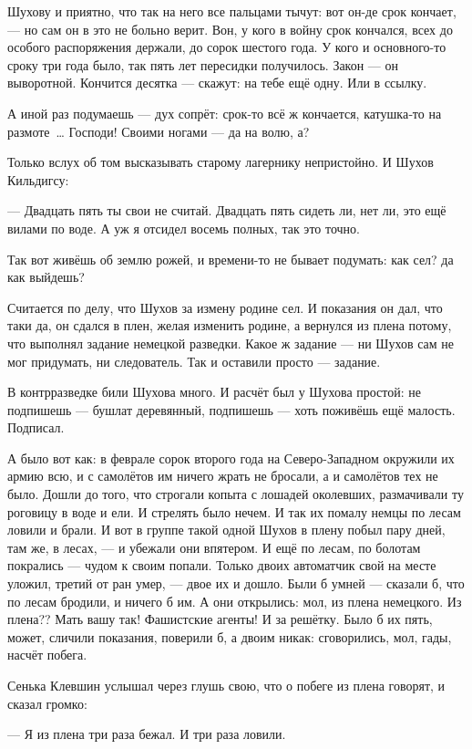Шухову и приятно, что так на него все пальцами тычут: вот он-де срок кончает, --- но сам он в это не больно верит. Вон, у кого в войну срок кончался, всех до особого распоряжения держали, до сорок шестого года. У кого и основного-то сроку три года было, так пять лет пересидки получилось. Закон --- он выворотной. Кончится десятка --- скажут: на тебе ещё одну. Или в ссылку.

А иной раз подумаешь --- дух сопрёт: срок-то всё ж кончается, катушка‐то на размоте~\dots{} Господи! Своими ногами --- да на волю, а?

Только вслух об том высказывать старому лагернику непристойно. И Шухов Кильдигсу:

--- Двадцать пять ты свои не считай. Двадцать пять сидеть ли, нет ли, это ещё вилами по воде. А уж я отсидел восемь полных, так это точно.

Так вот живёшь об землю рожей, и времени-то не бывает подумать: как сел? да как выйдешь?

Считается по делу, что Шухов за измену родине сел. И показания он дал, что таки да, он сдался в плен, желая изменить родине, а вернулся из плена потому, что выполнял задание немецкой разведки. Какое ж задание --- ни Шухов сам не мог придумать, ни следователь. Так и оставили просто --- задание.

В контрразведке били Шухова много. И расчёт был у Шухова простой: не подпишешь --- бушлат деревянный, подпишешь --- хоть поживёшь ещё малость. Подписал.

А было вот как: в феврале сорок второго года на Северо-Западном окружили их армию всю, и с самолётов им ничего жрать не бросали, а и самолётов тех не было. Дошли до того, что строгали копыта с лошадей околевших, размачивали ту роговицу в воде и ели. И стрелять было нечем. И так их помалу немцы по лесам ловили и брали. И вот в группе такой одной Шухов в плену побыл пару дней, там же, в лесах, --- и убежали они впятером. И ещё по лесам, по болотам покрались --- чудом к своим попали. Только двоих автоматчик свой на месте уложил, третий от ран умер, --- двое их и дошло. Были б умней --- сказали б, что по лесам бродили, и ничего б им. А они открылись: мол, из плена немецкого. Из плена?? Мать вашу так! Фашистские агенты! И за решётку. Было б их пять, может, сличили показания, поверили б, а двоим никак: сговорились, мол, гады, насчёт побега.

Сенька Клевшин услышал через глушь свою, что о побеге из плена говорят, и сказал громко:

--- Я из плена три раза бежал. И три раза ловили.

